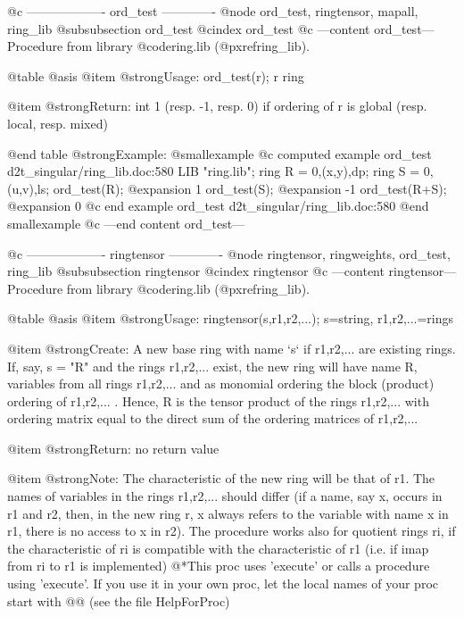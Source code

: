 @c ------------------- ord_test -------------
@node ord_test, ringtensor, mapall, ring_lib
@subsubsection ord_test
@cindex ord_test
@c ---content ord_test---
Procedure from library @code{ring.lib} (@pxref{ring_lib}).

@table @asis
@item @strong{Usage:}
ord_test(r); r ring

@item @strong{Return:}
int 1 (resp. -1, resp. 0) if ordering of r is global (resp. local,
resp. mixed)

@end table
@strong{Example:}
@smallexample
@c computed example ord_test d2t_singular/ring_lib.doc:580 
LIB "ring.lib";
ring R = 0,(x,y),dp;
ring S = 0,(u,v),ls;
ord_test(R);
@expansion{} 1
ord_test(S);
@expansion{} -1
ord_test(R+S);
@expansion{} 0
@c end example ord_test d2t_singular/ring_lib.doc:580
@end smallexample
@c ---end content ord_test---

@c ------------------- ringtensor -------------
@node ringtensor, ringweights, ord_test, ring_lib
@subsubsection ringtensor
@cindex ringtensor
@c ---content ringtensor---
Procedure from library @code{ring.lib} (@pxref{ring_lib}).

@table @asis
@item @strong{Usage:}
ringtensor(s,r1,r2,...); s=string, r1,r2,...=rings

@item @strong{Create:}
A new base ring with name `s` if r1,r2,... are existing rings.
If, say, s = "R" and the rings r1,r2,... exist, the new ring will
have name R, variables from all rings r1,r2,... and as monomial
ordering the block (product) ordering of r1,r2,... . Hence, R
is the tensor product of the rings r1,r2,... with ordering matrix
equal to the direct sum of the ordering matrices of r1,r2,...

@item @strong{Return:}
no return value

@item @strong{Note:}
The characteristic of the new ring will be that of r1. The names of
variables in the rings r1,r2,... should differ (if a name, say x,
occurs in r1 and r2, then, in the new ring r, x always refers to the
variable with name x in r1, there is no access to x in r2).
The procedure works also for quotient rings ri, if the characteristic
of ri is compatible with the characteristic of r1 (i.e. if imap from
ri to r1 is implemented)
@*This proc uses 'execute' or calls a procedure using 'execute'.
If you use it in your own proc, let the local names of your proc
start with @@ (see the file HelpForProc)

